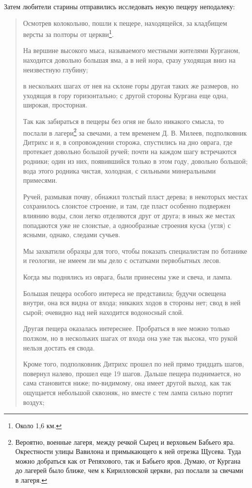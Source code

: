 Затем любители старины отправились исследовать некую пещеру неподалеку:

\begin{quotation}
Осмотрев колокольню, пошли к пещере, находящейся, за кладбищем версты за полторы от церкви\footnote{Около 1,6 км.}.

На вершине высокого мыса, называемого местными жителями Курганом, находится довольно большая яма, а в ней нора, сразу уходящая вниз на неизвестную глубину; 

в нескольких шагах от нея на склоне горы другая таких же размеров, но уходящая в гору горизонтально; с другой стороны Кургана еще одна, широкая, просторная.

Так как забираться в пещеры без огня не было никакого смысла, то послали в лагери\footnote{Вероятно, военные лагеря, между речкой Сырец и верховьем Бабьего яра. Окрестности улицы Вавилона и примыкающего к ней отрезка Щусева. Туда можно добраться как от Репяхового, так и Бабьего яров. Думаю, от Кургана до лагерей было ближе, чем к Кирилловской церкви, раз послали за свечами в лагеря.} за свечами, а тем временем Д. В. Милеев, подполковник Дитрихс и я, в сопровождении сторожа, спустились на дно оврага, где протекает довольно большой ручей; почти на каждом шагу встречаются родники; один из них, появившийся только в этом году, довольно большой; вода этого родника чистая, холодная, с сильными минеральными примесями.

Ручей, размывая почву, обнажил толстый пласт дерева; в некоторых местах сохранилось слоистое строение, и там, где пласт особенно подвержен влиянию воды, слои легко отделяются друг от друга; в иных же местах попадаются уже не слоистые, а однообразные строения куска (угля) с ясными, однако, следами сучьев.

Мы захватили образцы для того, чтобы показать специалистам по ботанике и геологии, не имеем ли мы дело с остатками первобытных лесов.

Когда мы поднялись из оврага, были принесены уже и свеча, и лампа.

Большая пещера особого интереса не представила; будучи освещена внутри, она вся видна от входа; никаких ходов в стороны нет; свод в ней сырой; очевидно над ней находится водоносный слой.

Другая пещера оказалась интереснее. Пробраться в нее можно только ползком, но в неско\-льких шагах от входа она уже так высока, что рукой нельзя достать ея свода.

Кроме того, подполковник Дитрихс прошел по ней прямо тридцать шагов, повернул налево, прошел еще 19 шагов. Дальше пещера поднимается, но сама становится ниже; по-видимому, она имеет другой выход, как так ощущается небольшой сквозняк, но вместе с тем лампа сильно портит воздух; 


\end{quotation}
